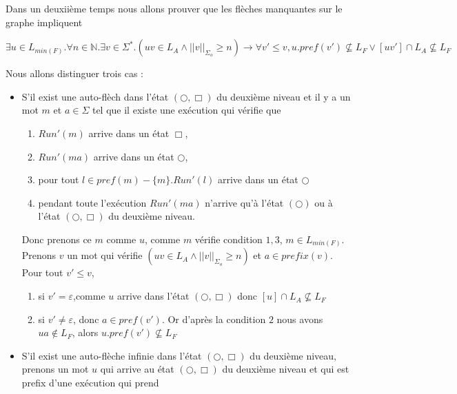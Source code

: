 \documentclass[a4paper,10pt]{article}
\begin{document}
Dans un deuxiième temps nous allons prouver que les flèches manquantes sur le graphe impliquent

$$\exists u \in L_{min(F)}. \forall n \in \mathbb{N}. \exists v \in \Sigma^*.(uv \in L_A \wedge ||v||_{\Sigma_o}\geq n) \to \forall v'\leq v, u.pref(v') \not \subseteq L_F \vee [uv'] \cap L_A \not \subseteq L_F$$

Nous allons distinguer trois cas :

\begin{itemize}
\item S'il exist une auto-fl\`ech dans l'\'etat $(\bigcirc,\Box)$ du deuxi\`eme niveau et il y a un mot $m$ et $a\in \Sigma$ tel que il existe une ex\'ecution qui v\'erifie que
  \begin{enumerate}
  \item $Run'(m)$ arrive dans un \'etat $\Box$,
  \item $Run'(ma)$ arrive dans un \'etat $\bigcirc$,
  \item pour tout $l \in pref(m)- \{m\}.Run'(l)$ arrive dans un \'etat $\bigcirc$
  \item pendant toute l'ex\'ecution $Run'(ma)$ n'arrive qu'\`a l'\'etat $(\bigcirc)$ ou \`a l'\'etat $(\bigcirc,\Box)$ du deuxi\`eme niveau.
  \end{enumerate}
  Donc prenons ce $m$ comme $u$, comme $m$ v\'erifie condition $1,3$, $m \in L_{min(F)}$. Prenons $v$ un mot qui v\'erifie $(uv \in L_A \wedge ||v||_{\Sigma_o}\geq n)$ et $a\in prefix(v)$. Pour tout $v'\leq v$,
  \begin{enumerate}

  \item si $v'= \varepsilon$,comme $u$ arrive dans l'\'etat $(\bigcirc,\Box)$ donc $[u]\cap L_A \not \subseteq L_F$
  \item si $v'\neq \varepsilon$, donc $a\in pref(v')$. Or d'apr\`es la condition $2$ nous avons $ua \not \in L_F$, alors $u.pref(v')\not\subseteq L_F$  
  \end{enumerate}
  \item S'il exist une auto-fl\`eche infinie dans l'\'etat $(\bigcirc,\Box)$ du deuxi\`eme niveau, prenons un mot $u$ qui arrive au \'etat $(\bigcirc,\Box)$ du deuxi\`eme niveau et qui est prefix d'une ex\'ecution qui prend
\end{itemize}
\end{document}
